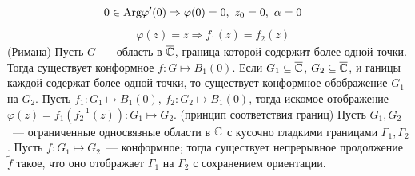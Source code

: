 \begin{align*}
  & 0 \in \Arg \varphi'(0) \Rightarrow \varphi(0) = 0, \ z_0 = 0, \ \alpha = 0
\end{align*}
\begin{align*}
  & \varphi(z) = z \Rightarrow f_1(z) = f_2(z)
\end{align*}
\theorem (Римана)
Пусть $G$~--- область в $\overline{\mathbb{C}}$, граница которой содержит более одной точки.
Тогда существует конформное $f: G \mapsto B_1(0)$.
\corollary
Если $G_1 \subseteq \overline{\mathbb{C}}$, $G_2 \subseteq \overline{\mathbb{C}}$, и ганицы каждой содержат более
одной точки, то существует конформное обображение $G_1$ на $G_2$.
\pr
Пусть $f_1: G_1 \mapsto B_1(0)$, $f_2: G_2 \mapsto B_1(0)$, тогда искомое
отображение $\varphi(z) = f_1(f_2^{-1}(z)): G_1 \mapsto G_2$.
\theorem (принцип соответствия границ)
Пусть $G_1, G_2$~--- ограниченные односвязные области в $\mathbb{C}$ с кусочно гладкими
границами $\Gamma_1, \Gamma_2$. Пусть $f: G_1 \mapsto G_2$~--- конформное; тогда
существует непрерывное продолжение $\tilde{f}$ такое, что оно отображает
$\Gamma_1$ на $\Gamma_2$ с сохранением ориентации.